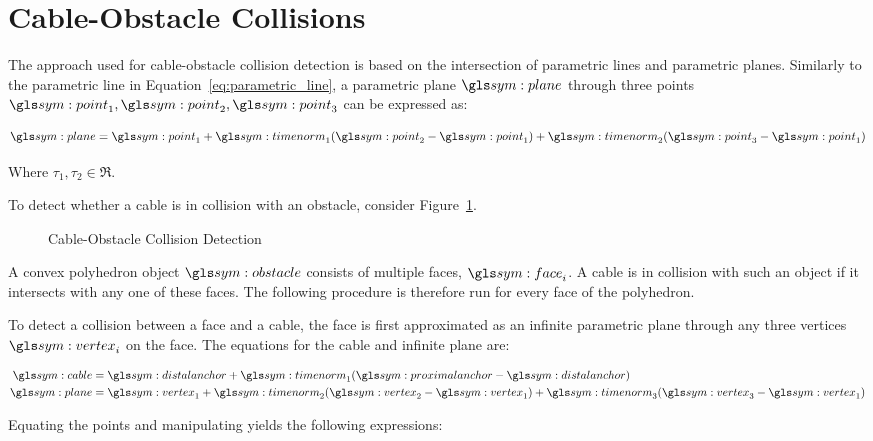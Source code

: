 \section{Cable-Obstacle Collisions}%
\label{sec:cable_obstacle_collisions}

	The approach used for cable-obstacle collision detection is based on the
	intersection of parametric lines and parametric planes. Similarly to the
	parametric line in Equation~\ref{eq:parametric_line}, a parametric plane
	$\plane$ through three points $\point_1, \point_2, \point_3$ can be
	expressed as:

	\begin{equation}
		\plane = \point_1 + \timenorm_1(\point_2 - \point_1) +
		\timenorm_2(\point_3 - \point_1)
	\end{equation}

	Where $\tau_1, \tau_2 \in \Re$.

	To detect whether a cable is in collision with an obstacle, consider
	Figure~\ref{fig:cable_obstacle_collision_detection}.

	\begin{figure}[hb]
		\caption{Cable-Obstacle Collision Detection}%
		\label{fig:cable_obstacle_collision_detection}
	\end{figure}

	A convex polyhedron object $\obstacle$ consists of multiple faces,
	${\face}_i$. A cable is in collision with such an object if it intersects
	with any one of these faces.  The following procedure is therefore run for
	every face of the polyhedron.

	To detect a collision between a face and a cable, the face is first
	approximated as an infinite parametric plane through any three vertices
	$\vertex_i$ on the face. The equations for the cable and infinite plane are:

	\begin{align}
		\cable &= \distalanchor + \timenorm_1(\proximalanchor - \distalanchor)\\
		\plane &= \vertex_1 + \timenorm_2(\vertex_2 - \vertex_1) +
		\timenorm_3(\vertex_3 - \vertex_1)
	\end{align}

	Equating the points and manipulating yields the following expressions:

